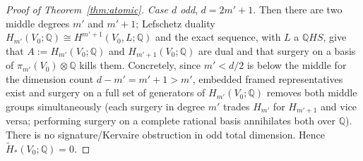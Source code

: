 \documentclass[12pt]{article}
\theoremstyle{definition}
\begin{document}
\begin{proof}[Proof of Theorem~\ref{thm:atomic}]
\emph{Case $d$ odd}, $d=2m'+1$. Then there are two middle degrees $m'$ and
$m'+1$; Lefschetz duality $H_{m'}(V_0;\mathbb{Q})\cong
H^{m'+1}(V_0,L;\mathbb{Q})$ and the exact sequence, with $L$ a $\mathbb{Q}HS$,
give that $A:=H_{m'}(V_0;\mathbb{Q})$ and $H_{m'+1}(V_0;\mathbb{Q})$ are dual
and that surgery on a basis of $\pi_{m'}(V_0)\otimes\mathbb{Q}$ kills them.
Concretely, since $m'<d/2$ is below the middle for the dimension count
$d-m'=m'+1>m'$, embedded framed representatives exist and surgery on a full set
of generators of $H_{m'}(V_0;\mathbb{Q})$ removes both middle groups
simultaneously (each surgery in degree $m'$ trades $H_{m'}$ for $H_{m'+1}$ and
vice versa; performing surgery on a complete rational basis annihilates both
over $\mathbb{Q}$). There is no signature/Kervaire obstruction in odd total
dimension. Hence $\widetilde H_*(V_0;\mathbb{Q})=0$.


\end{proof}
\end{document}
